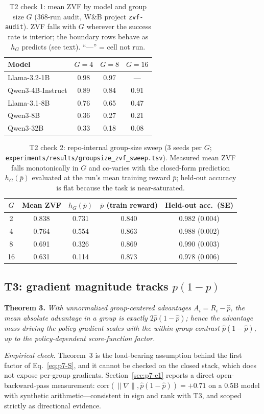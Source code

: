 \begin{table}[t]
\centering
\caption{T2 check 1: mean ZVF by model and group size $G$ (368-run audit,
W\&B project \texttt{zvf-audit}). ZVF falls with $G$ wherever the success
rate is interior; the boundary rows behave as $h_G$ predicts (see text).
``---'' = cell not run.}
\label{tab:p7-modelG}
\begin{tabular}{lccc}
\toprule
Model & $G{=}4$ & $G{=}8$ & $G{=}16$ \\
\midrule
Llama-3.2-1B        & 0.98 & 0.97 & --- \\
Qwen3-4B-Instruct   & 0.89 & 0.84 & 0.91 \\
Llama-3.1-8B        & 0.76 & 0.65 & 0.47 \\
Qwen3-8B            & 0.36 & 0.27 & 0.21 \\
Qwen3-32B           & 0.33 & 0.18 & 0.08 \\
\bottomrule
\end{tabular}
\end{table}

\begin{table}[t]
\centering
\caption{T2 check 2: repo-internal group-size sweep (3 seeds per $G$;
\texttt{experiments/results/groupsize\_zvf\_sweep.tsv}). Measured mean ZVF
falls monotonically in $G$ and co-varies with the closed-form prediction
$h_G(\bar p)$ evaluated at the run's mean training reward $\bar p$; held-out
accuracy is flat because the task is near-saturated.}
\label{tab:p7-gsweep}
\begin{tabular}{ccccc}
\toprule
$G$ & Mean ZVF & $h_G(\bar p)$ & $\bar p$ (train reward) & Held-out acc.\ (SE) \\
\midrule
2  & 0.838 & 0.731 & 0.840 & 0.982 (0.004) \\
4  & 0.764 & 0.554 & 0.863 & 0.988 (0.002) \\
8  & 0.691 & 0.326 & 0.869 & 0.990 (0.003) \\
16 & 0.631 & 0.114 & 0.873 & 0.978 (0.006) \\
\bottomrule
\end{tabular}
\end{table}

\subsection{T3: gradient magnitude tracks $p(1-p)$}
\label{sec:p7-t3}
\textbf{Theorem 3.} \emph{With unnormalized group-centered advantages
$A_i = R_i - \hat p$, the mean absolute advantage in a group is exactly
$2\hat p(1 - \hat p)$; hence the advantage mass driving the policy gradient
scales with the within-group contrast $\hat p(1-\hat p)$, up to the
policy-dependent score-function factor.}

\emph{Empirical check.} Theorem~3 is the load-bearing assumption behind the
first factor of Eq.~\eqref{eq:p7-S}, and it cannot be checked on the closed
stack, which does not expose per-group gradients. Section~\ref{sec:p7-e1}
reports a direct open-backward-pass measurement:
$\mathrm{corr}(\|\nabla\|, \hat p(1-\hat p)) = +0.71$ on a 0.5B model with
synthetic arithmetic---consistent in sign and rank with T3, and scoped
strictly as directional evidence.
